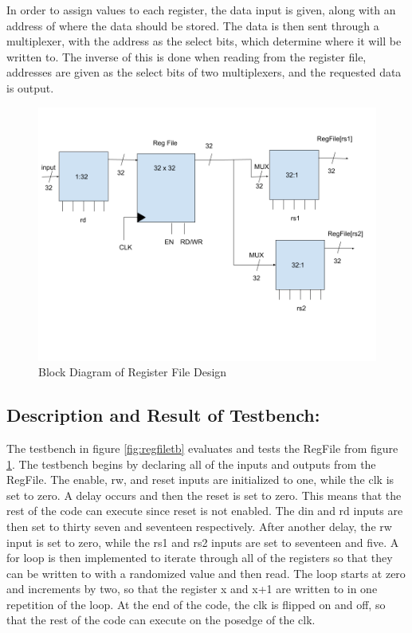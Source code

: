 \documentclass[10pt,letterpaper]{article}
\begin{document}
In order to assign values to each register, the data input is given, along with an address of where the data should be stored. The data is then sent through a multiplexer, with the address as the select bits, which determine where it will be written to. The inverse of this is done when reading from the register file, addresses are given as the select bits of two multiplexers, and the requested data is output.
\begin{figure}[H]
	\centering
	\includegraphics[width=0.7\linewidth]{Figures/RegFileDesign}
	\caption{Block Diagram of Register File Design}
	\label{fig:regfiledesign}
\end{figure}

\subsection{Description and Result of Testbench:}

The testbench in figure \ref*{fig:regfiletb} evaluates and tests the RegFile from figure \ref*{fig:regfiledesign}. The testbench begins by declaring all of the inputs and outputs from the RegFile. The enable, rw, and reset inputs are initialized to one, while the clk is set to zero. A delay occurs and then the reset is set to zero. This means that the rest of the code can execute since reset is not enabled. The din and rd inputs are then set to thirty seven and seventeen respectively. After another delay, the rw input is set to zero, while the rs1 and rs2 inputs are set to seventeen and five. A for loop is then implemented to iterate through all of the registers so that they can be written to with a randomized value  and then read. The loop starts at zero and increments by two, so that the register x and x+1 are written to in one repetition of the loop. At the end of the code, the clk is flipped on and off, so that the rest of the code can execute on the posedge of the clk. 
\end{document}
